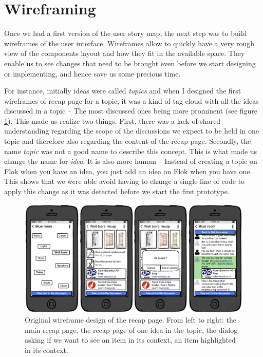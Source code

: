 \documentclass[a4paper,12pt, oneside]{article}
\begin{document}
\clearpage

\section{Wireframing}
Once we had a first version of the user story map, the next step was to build wireframes of the user interface.
Wireframes allow to quickly have a very rough view of the components layout and how they fit in the available space.
They enable us to see changes that need to be brought even before we start designing or implementing, and hence save us some precious time.

For instance, initially ideas were called \emph{topics} and when I designed the first wireframes of recap page for a topic, it was a kind of tag cloud with all the ideas discussed in a topic – The most discussed ones being more prominent (see figure \ref{fig.originalRecapWireframes}).
This made us realize two things.
First, there was a lack of shared understanding regarding the scope of the discussions we expect to be held in one topic and therefore also regarding the content of the recap page.
Secondly, the name \emph{topic} was not a good name to describe this concept.
This is what made us change the name for \emph{idea}. It is also more human – Instead of creating a topic on Flok when you have an idea, you just add an idea on Flok when you have one.
This shows that we were able avoid having to change a single line of code to apply this change as it was detected before we start the first prototype.

\begin{figure}[!htb]
    \centering
    \includegraphics[width=\textwidth]{images/originalRecapWireframes.png}
    \caption{Original wireframe design of the recap page. From left to right: the main recap page, the recap page of one idea in the topic, the dialog asking if we want to see an item in its context, an item highlighted in its context.}
    \label{fig.originalRecapWireframes}
\end{figure}
\end{document}

